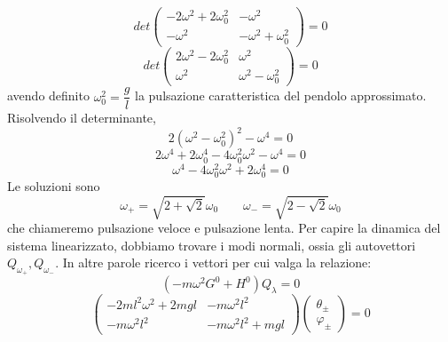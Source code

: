 \documentclass[a4paper,openany]{article}
\begin{document}
	$$
	det
	\begin{pmatrix}
		-2\omega^2 + 2\omega_0^2 & -\omega^{2} \\
		-\omega^{2} & -\omega^{2}+ \omega_0^2
	\end{pmatrix} = 0
	$$
	$$
	det
	\begin{pmatrix}
		2\omega^2 - 2\omega_0^2 & \omega^{2} \\
		\omega^{2} & \omega^{2} - \omega_0^2
	\end{pmatrix} = 0
	$$
	avendo definito $\omega_{0}^{2} = \dfrac{g}{l}$ la pulsazione caratteristica del pendolo approssimato. Risolvendo il determinante, 
	$$
	2(\omega^{2}-\omega_{0}^{2})^2- \omega^{4} = 0
	$$
	$$
	2\omega^{4}+2\omega_{0}^{4} - 4\omega_{0}^2\omega^{2} - \omega^{4} = 0
	$$
	$$
	\omega^{4} - 4\omega_{0}^2\omega^{2} +2 \omega_{0}^{4} = 0
	$$
	Le soluzioni sono
	$$
	\omega_{+} = \sqrt{2+\sqrt{2}}\omega_0 \>\>\>\>\>\>\>\>\> \omega_{-} = \sqrt{2-\sqrt{2}}\omega_0
	$$
	che chiameremo pulsazione veloce e pulsazione lenta. Per capire la dinamica del sistema linearizzato, dobbiamo trovare i modi normali, ossia gli autovettori $Q_{\omega_{+}}, Q_{\omega_{-}}$. In altre parole ricerco i vettori per cui valga la relazione:
	\begin{equation}\label{key}
		(-m\omega^{2}G^0 + H^0)Q_{\lambda} = 0
	\end{equation}
	\begin{equation*}\label{key}
		\begin{pmatrix}
			-2ml^2\omega^2 + 2mgl & -m\omega^{2}l^2 \\
			-m\omega^{2}l^{2} & -m\omega^{2}l^2+mgl
		\end{pmatrix}
		\begin{pmatrix}
			\theta_{\pm} \\ \varphi_{\pm}
		\end{pmatrix} = 0
	\end{equation*}
	
\end{document}
